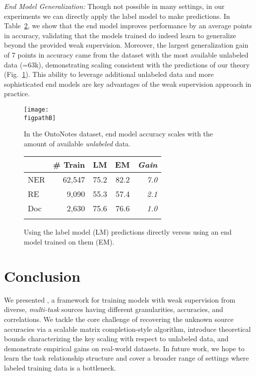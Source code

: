 \documentclass[letterpaper]{article}
\begin{document}
\textit{End Model Generalization:}
Though not possible in many settings, in our experiments we can directly apply the label model to make predictions.
In Table~\ref{tab:end_model_boost}, we show that the end model improves performance by an average  points in accuracy, validating that the models trained do indeed learn to generalize beyond the provided weak supervision.
Moreover, the largest generalization gain of 7 points in accuracy came from the dataset with the most available unlabeled data (=63k), demonstrating scaling consistent with the predictions of our theory (Fig.~\ref{fig:onto_scale}).
This ability to leverage additional unlabeled data and more sophisticated end models are key advantages of the weak supervision approach in practice.

\begin{figure}
  \centering
  \texttt{[image: \\figpathB]}\caption{In the OntoNotes dataset, end model accuracy scales with the amount of available \textit{unlabeled} data.}
  \label{fig:onto_scale}
\end{figure}

\begin{figure}
  \centering
\begin{tabular}{lrrrr}
      \toprule
        & \# Train & LM & EM & \textit{Gain} \\
      \midrule
      NER
        & 62,547
        & 75.2
        & 82.2
        & \textit{7.0}
        \\
      RE
        & 9,090
        & 55.3
        & 57.4
        & \textit{2.1}
        \\
      Doc
        & 2,630
        & 75.6
        & 76.6
        & \textit{1.0}
        \\
      \bottomrule\\
    \end{tabular}
  \caption{Using the label model (LM) predictions directly versus using an end model trained on them (EM).}
  \label{tab:end_model_boost}
\end{figure}
 
\section{Conclusion}
\label{sec:conclusion}


We presented \systemx, a framework for training models with weak supervision from diverse, \textit{multi-task} sources having different granularities, accuracies, and correlations.
We tackle the core challenge of recovering the unknown source accuracies via a scalable matrix completion-style algorithm, introduce theoretical bounds characterizing the key scaling with respect to unlabeled data, and demonstrate empirical gains on real-world datasets.
In future work, we hope to learn the task relationship structure and cover a broader range of settings where labeled training data is a bottleneck.
\end{document}
